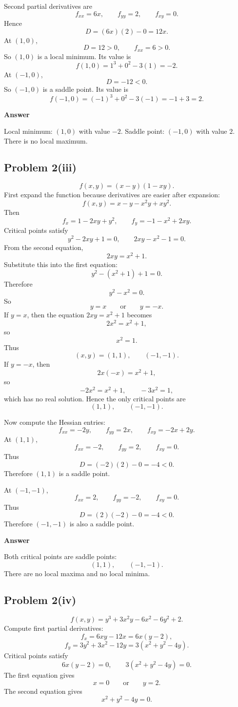 \documentclass[11pt]{article}
\newenvironment{answerbox}[1]{\par\medskip\noindent\textcolor{linegreen}{\textbf{#1}}\par\smallskip}{\par\medskip}
\begin{document}
Second partial derivatives are
\[
f_{xx}=6x,
\qquad f_{yy}=2,
\qquad f_{xy}=0.
\]
Hence
\[
D=(6x)(2)-0=12x.
\]
At $(1,0)$,
\[
D=12>0,
\qquad f_{xx}=6>0.
\]
So $(1,0)$ is a local minimum.  Its value is
\[
f(1,0)=1^3+0^2-3(1)=-2.
\]
At $(-1,0)$,
\[
D=-12<0.
\]
So $(-1,0)$ is a saddle point.  Its value is
\[
f(-1,0)=(-1)^3+0^2-3(-1)=-1+3=2.
\]

\begin{answerbox}{Answer}
Local minimum: $(1,0)$ with value $-2$.  Saddle point: $(-1,0)$ with value $2$.  There is no local maximum.
\end{answerbox}

\subsection*{Problem 2(iii)}
\[
f(x,y)=(x-y)(1-xy).
\]
First expand the function because derivatives are easier after expansion:
\[
f(x,y)=x-y-x^2y+xy^2.
\]
Then
\[
f_x=1-2xy+y^2,
\qquad
f_y=-1-x^2+2xy.
\]
Critical points satisfy
\[
y^2-2xy+1=0,
\qquad
2xy-x^2-1=0.
\]
From the second equation,
\[
2xy=x^2+1.
\]
Substitute this into the first equation:
\[
y^2-(x^2+1)+1=0.
\]
Therefore
\[
y^2-x^2=0.
\]
So
\[
y=x
\qquad\text{or}\qquad y=-x.
\]
If $y=x$, then the equation $2xy=x^2+1$ becomes
\[
2x^2=x^2+1,
\]
so
\[
x^2=1.
\]
Thus
\[
(x,y)=(1,1),\qquad (-1,-1).
\]
If $y=-x$, then
\[
2x(-x)=x^2+1,
\]
so
\[
-2x^2=x^2+1,
\qquad -3x^2=1,
\]
which has no real solution. Hence the only critical points are
\[
(1,1),
\qquad (-1,-1).
\]

Now compute the Hessian entries:
\[
f_{xx}=-2y,
\qquad f_{yy}=2x,
\qquad f_{xy}=-2x+2y.
\]
At $(1,1)$,
\[
f_{xx}=-2,
\qquad f_{yy}=2,
\qquad f_{xy}=0.
\]
Thus
\[
D=(-2)(2)-0=-4<0.
\]
Therefore $(1,1)$ is a saddle point.

At $(-1,-1)$,
\[
f_{xx}=2,
\qquad f_{yy}=-2,
\qquad f_{xy}=0.
\]
Thus
\[
D=(2)(-2)-0=-4<0.
\]
Therefore $(-1,-1)$ is also a saddle point.

\begin{answerbox}{Answer}
Both critical points are saddle points:
\[
(1,1),
\qquad (-1,-1).
\]
There are no local maxima and no local minima.
\end{answerbox}

\subsection*{Problem 2(iv)}
\[
f(x,y)=y^3+3x^2y-6x^2-6y^2+2.
\]
Compute first partial derivatives:
\[
f_x=6xy-12x=6x(y-2),
\]
\[
f_y=3y^2+3x^2-12y=3(x^2+y^2-4y).
\]
Critical points satisfy
\[
6x(y-2)=0,
\qquad 3(x^2+y^2-4y)=0.
\]
The first equation gives
\[
x=0
\qquad\text{or}\qquad y=2.
\]
The second equation gives
\[
x^2+y^2-4y=0.
\]
\end{document}
